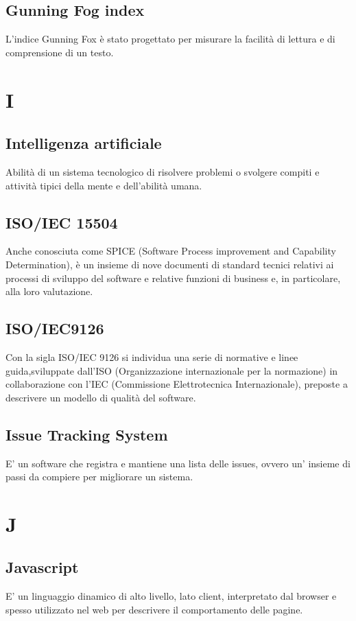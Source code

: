     \subsection*{Gunning Fog index}
L’indice Gunning Fox è stato progettato per misurare la facilità di lettura e di comprensione di un testo.
\newpage
    
\section{I}
    \subsection*{Intelligenza artificiale}
Abilità di un sistema tecnologico di risolvere problemi o svolgere compiti e attività tipici della mente e dell’abilità umana.
    \subsection*{ISO/IEC 15504}
Anche conosciuta come SPICE (Software Process improvement and Capability Determination), è un insieme di nove documenti di standard tecnici relativi ai processi di sviluppo del software e relative funzioni di business e, in particolare, alla loro valutazione.
    \subsection*{ISO/IEC9126}
Con la sigla ISO/IEC 9126 si individua una serie di normative e linee guida,sviluppate dall’ISO (Organizzazione internazionale per la normazione) in collaborazione con l’IEC (Commissione Elettrotecnica Internazionale), preposte a descrivere un modello di qualità del software.
    \subsection*{Issue Tracking System}
E’ un software che registra e mantiene una lista delle issues, ovvero un’ insieme di passi da compiere per migliorare un sistema.
\newpage
    
\section{J}
    \subsection*{Javascript}
E’ un linguaggio dinamico di alto livello, lato client, interpretato dal browser e spesso utilizzato nel web per descrivere il comportamento delle pagine.

